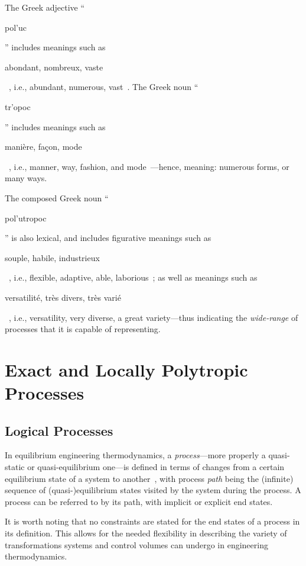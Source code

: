 \documentclass[fleqn,11pt]{SelfArx}
\newcommand{\GRtxt}[1]{\begin{otherlanguage}{greek}{{#1}}\end{otherlanguage}}
\newcommand{\FRtxt}[1]{\begin{otherlanguage}{french}{{#1}}\end{otherlanguage}}
\begin{document}
    The Greek adjective  ``\GRtxt{pol'uc}''  includes  meanings  such  as  \FRtxt{\og  abondant,
    nombreux,   vaste   \fg}~\cite{1968-Chantraine-Klincksieck},   i.e.,   abundant,   numerous,
    vast~\cite{2009-BarrierMA+ViviesC-Auzou,  2011-SilvaASM-WMFMartinsFontes}.  The  Greek  noun
    ``\GRtxt{tr'opoc}''  includes   meanings   such   as   \FRtxt{\og   manière,   façon,   mode
    \fg}~\cite{2000-BaillyA-Hachette},      i.e.,      manner,      way,      fashion,       and
    mode~\cite{2009-BarrierMA+ViviesC-Auzou,  2011-SilvaASM-WMFMartinsFontes}---hence,  meaning:
    numerous forms, or many ways.

    The composed Greek noun ``\GRtxt{pol'utropoc}'' is also  lexical,  and  includes  figurative
    meanings such as \FRtxt{\og souple, habile,  industrieux  \fg}~\cite{2000-BaillyA-Hachette},
    i.e., flexible, adaptive, able, laborious~\cite{2011-SilvaASM-WMFMartinsFontes}; as well  as
    meanings    such    as    \FRtxt{\og    versatilité,     très     divers,     très     varié
    \fg}~\cite{2000-BaillyA-Hachette}, i.e., versatility, very diverse, a  great  variety---thus
    indicating the \emph{wide-range} of processes that it is capable of representing.

\section{Exact and Locally Polytropic Processes}

    \subsection{Logical Processes}

    In equilibrium engineering thermodynamics, a \emph{process}---more properly  a  quasi-static
    or quasi-equilibrium one---is defined in terms of changes from a certain  equilibrium  state
    of a system to another~\cite{2013-CengelYA+BolesMA-AMGH}, with process \emph{path} being the
    (infinite) sequence of (quasi-)equilibrium states visited by the system during the  process.
    A process can be referred to by its path, with implicit or explicit end states.

    It is worth noting that no constraints are stated for the end states of  a  process  in  its
    definition.  This  allows  for  the  needed  flexibility  in  describing  the   variety   of
    transformations systems and control volumes can undergo in engineering thermodynamics.
\end{document}
